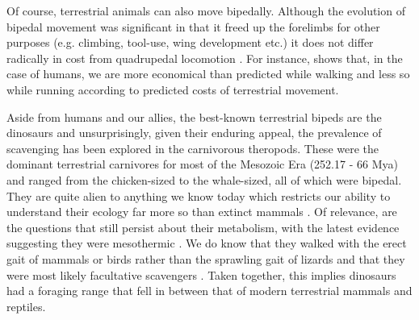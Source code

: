 \documentclass[a4paper,12pt]{article}
\begin{document}
Of course, terrestrial animals can also move bipedally. 
Although the evolution of bipedal movement was significant in that it freed up the forelimbs for other purposes (e.g. climbing, tool-use, wing development etc.) it does not differ radically in cost from quadrupedal locomotion \citep[][and references therein]{williams1999evolution}. 
For instance, \cite{alexander2004bipedal} shows that, in the case of humans, we are more economical than predicted while walking and less so while running according to predicted costs of terrestrial movement. 

Aside from humans and our allies, the best-known terrestrial bipeds are the dinosaurs and unsurprisingly, given their enduring appeal, the prevalence of scavenging has been explored in the carnivorous theropods.
These were the dominant terrestrial carnivores for most of the Mesozoic Era (252.17 - 66 Mya) and ranged from the chicken-sized to the whale-sized, all of which were bipedal.
They are quite alien to anything we know today which restricts our ability to understand their ecology far more so than extinct mammals \citep{weishampel2004dinosauria}.
Of relevance, are the questions that still persist about their metabolism, with the latest evidence suggesting they were mesothermic \citep[i.e. intermediate to ecto- and endotherms;][]{grady2014evidence}. 
We do know that they walked with the erect gait of mammals or birds rather than the sprawling gait of lizards and that they were most likely facultative scavengers \citep{weishampel2004dinosauria,depalma2013physical}.
Taken together, this implies dinosaurs had a foraging range that fell in between that of modern terrestrial mammals and reptiles. 


\end{document}

